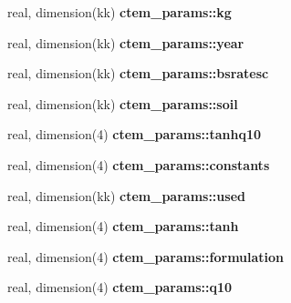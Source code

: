 \begin{DoxyCompactItemize}
\item 
\hypertarget{namespacectem__params_afc41ce97c641843180c6a14e2c06d2a2}{}real, dimension(kk) {\bfseries ctem\+\_\+params\+::kg}\label{namespacectem__params_afc41ce97c641843180c6a14e2c06d2a2}

\item 
\hypertarget{namespacectem__params_a7107e6d084ca77eafeed6a4b10d26bc3}{}real, dimension(kk) {\bfseries ctem\+\_\+params\+::year}\label{namespacectem__params_a7107e6d084ca77eafeed6a4b10d26bc3}

\item 
\hypertarget{namespacectem__params_a25b64781ac846ded3ac9024e4b4074bb}{}real, dimension(kk) {\bfseries ctem\+\_\+params\+::bsratesc}\label{namespacectem__params_a25b64781ac846ded3ac9024e4b4074bb}

\item 
\hypertarget{namespacectem__params_adccb2303e0055c9b1bd298d437b949c1}{}real, dimension(kk) {\bfseries ctem\+\_\+params\+::soil}\label{namespacectem__params_adccb2303e0055c9b1bd298d437b949c1}

\item 
\hypertarget{namespacectem__params_a04f581d88bb99a2d4d4128f684a46ba6}{}real, dimension(4) {\bfseries ctem\+\_\+params\+::tanhq10}\label{namespacectem__params_a04f581d88bb99a2d4d4128f684a46ba6}

\item 
\hypertarget{namespacectem__params_a83582748b1671b5afb2900460f50ae1a}{}real, dimension(4) {\bfseries ctem\+\_\+params\+::constants}\label{namespacectem__params_a83582748b1671b5afb2900460f50ae1a}

\item 
\hypertarget{namespacectem__params_a8599cf37584edfb139537fefee3810de}{}real, dimension(kk) {\bfseries ctem\+\_\+params\+::used}\label{namespacectem__params_a8599cf37584edfb139537fefee3810de}

\item 
\hypertarget{namespacectem__params_a3f79e0a9a2400a843ac0ee9f14ba87ef}{}real, dimension(4) {\bfseries ctem\+\_\+params\+::tanh}\label{namespacectem__params_a3f79e0a9a2400a843ac0ee9f14ba87ef}

\item 
\hypertarget{namespacectem__params_a7042d89151353c6feb97ddcea813322f}{}real, dimension(4) {\bfseries ctem\+\_\+params\+::formulation}\label{namespacectem__params_a7042d89151353c6feb97ddcea813322f}

\item 
\hypertarget{namespacectem__params_a9f1407faeb39ea0e41e45ff6f9add2af}{}real, dimension(4) {\bfseries ctem\+\_\+params\+::q10}\label{namespacectem__params_a9f1407faeb39ea0e41e45ff6f9add2af}


\end{DoxyCompactItemize}
